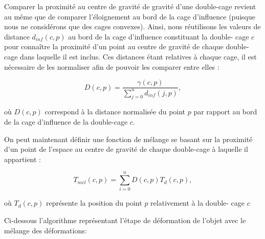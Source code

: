Comparer la proximité au centre de gravité de gravité d'une double-cage
revient au même que de comparer l'éloignement au bord de la cage d'influence
(puisque nous ne considérons que des cages convexes). Ainsi, nous réutilisons
les valeurs de distance $d_{inf}(c, p)$ au bord de la cage d'influence
constituant la double- cage $c$ pour connaître la proximité d'un point au
centre de gravité de chaque double-cage dans laquelle il est inclus. Ces
distances étant relatives à chaque cage, il est nécessaire de les normaliser
afin de pouvoir les comparer entre elles :

\begin{displaymath}
  D(c, p) = \frac{\gamma(c, p)}{\sum_{j=0}^n d_{inf}(j, p)}, 
\end{displaymath}

où $D(c, p)$ correspond à la distance normalisée du point $p$ par rapport au
bord de la cage d'influence de la double-cage $c$.

On peut maintenant définir une fonction de mélange se basant sur la proximité
d'un point de l'espace au centre de gravité de chaque double-cage à laquelle
il appartient :

\begin{displaymath}
  T_{mel}(c, p) = \sum_{i=0}^n D(c, p) T_{d}(c, p),
\end{displaymath}

où $T_{d}(c, p)$ représente la position du point $p$ relativement à la double-
cage $c$

Ci-dessous l'algorithme représentant l'étape de déformation de l'objet avec le
mélange des déformations: \\


